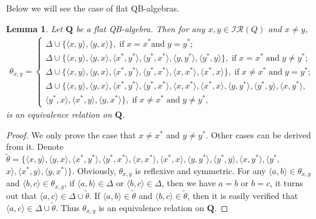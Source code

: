 \documentclass[12pt]{amsart}
\newtheorem{lemma}{Lemma}[section]
\theoremstyle{definition}
\theoremstyle{remark}
\numberwithin{equation}{section}
\begin{document}
Below we will see the case of flat QB-algebras.


\begin{lemma}\label{xy equ2}
Let $\mathbf{Q}$ be a flat QB-algebra. Then for any $x,y\in \mathscr{IR}(Q)$ and $x\neq y$,
\begin{eqnarray*}
\theta_{x,y}= \left\{
          \begin{array}{ll}
      \Delta \cup \{\langle x,y\rangle, \langle y,x\rangle \}, \;\mathrm{if}\;x=x^{\ast}\mathrm{and}\; y= y^{\ast};\\
      \Delta \cup \{\langle x,y\rangle, \langle y,x\rangle, \langle x^{\ast},y^{\ast}\rangle, \langle y^{\ast},x^{\ast}\rangle,\langle y,y^{\ast}\rangle,\langle y^{\ast},y\rangle \},\;\mathrm{if}\; x=x^{\ast}\; \mathrm{and}\; y\neq y^{\ast};\\
      \Delta \cup \{\langle x,y\rangle, \langle y,x\rangle, \langle x^{\ast},y^{\ast}\rangle, \langle y^{\ast},x^{\ast}\rangle,\langle x,x^{\ast}\rangle,\langle x^{\ast},x\rangle \},\;\mathrm{if}\; x\neq x^{\ast}\; \mathrm{and}\; y= y^{\ast};\\
      \Delta \cup \{\langle x,y\rangle, \langle y,x\rangle, \langle x^{\ast},y^{\ast}\rangle, \langle y^{\ast},x^{\ast}\rangle,\langle x,x^{\ast}\rangle,\langle x^{\ast},x\rangle,\langle y,y^{\ast}\rangle,\langle y^{\ast},y\rangle,\langle x,y^{\ast}\rangle,\\ \langle y^{\ast},x\rangle,\langle x^{\ast},y\rangle,\langle y,x^{\ast}\rangle \},\;\mathrm{if}\; x\neq x^{\ast}\; \mathrm{and}\; y\neq y^{\ast},
          \end{array}
        \right.
\end{eqnarray*}
is an equivalence relation on $\mathbf{Q}$.
\end{lemma}

\begin{proof} We only prove the case that $x\neq x^{\ast}$ and $ y\neq y^{\ast}$. Other cases can be derived from it.
Denote $\tilde{\theta}=\{\langle x,y\rangle,\langle y,x\rangle, \langle x^{\ast},y^{\ast}\rangle, \langle y^{\ast}, x^{\ast}\rangle,\langle x,x^{\ast}\rangle,\langle x^{\ast},x\rangle,\langle y,y^{\ast}\rangle,\langle y^{\ast},y\rangle,\langle x,y^{\ast}\rangle, \langle y^{\ast},$ $x\rangle,\langle x^{\ast},y\rangle,\langle y, x^{\ast}\rangle\}$.
Obviously, $\theta_{x,y}$ is reflexive and symmetric.
For any $\langle a,b\rangle\in \theta_{x,y}$ and $\langle b,c\rangle\in \theta_{x,y}$,
if $\langle a,b\rangle\in \Delta$ or $\langle b,c\rangle\in \Delta$, then we have $a=b$ or $b=c$, it turns out that $\langle a,c\rangle\in \Delta \cup \tilde{\theta}$.
If $\langle a,b\rangle\in\tilde{\theta}$ and $\langle b,c\rangle\in\tilde{\theta}$, then it is easily verified that $\langle a,c\rangle\in \Delta \cup \tilde{\theta}$.
Thus $\theta_{x,y}$ is an equivalence relation on $\mathbf{Q}$.
\end{proof}
\end{document}
